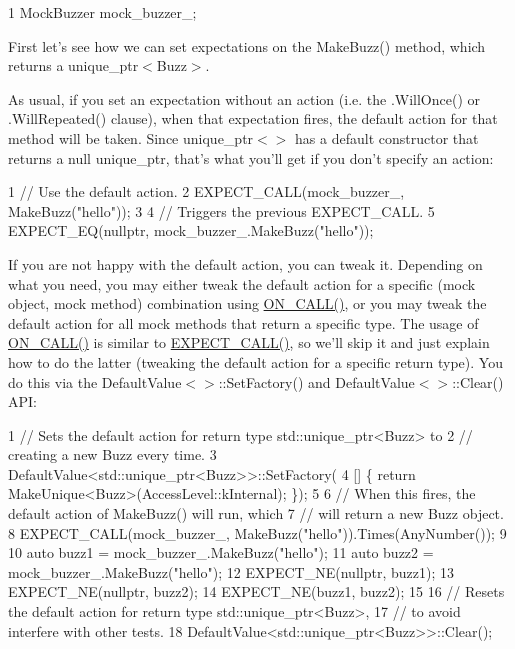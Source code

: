 \begin{DoxyCode}
1 MockBuzzer mock\_buzzer\_;
\end{DoxyCode}


First let’s see how we can set expectations on the {\ttfamily Make\+Buzz()} method, which returns a {\ttfamily unique\+\_\+ptr$<$Buzz$>$}.

As usual, if you set an expectation without an action (i.\+e. the {\ttfamily .Will\+Once()} or {\ttfamily .Will\+Repeated()} clause), when that expectation fires, the default action for that method will be taken. Since {\ttfamily unique\+\_\+ptr$<$$>$} has a default constructor that returns a null {\ttfamily unique\+\_\+ptr}, that’s what you’ll get if you don’t specify an action\+:


\begin{DoxyCode}
1 // Use the default action.
2 EXPECT\_CALL(mock\_buzzer\_, MakeBuzz("hello"));
3 
4 // Triggers the previous EXPECT\_CALL.
5 EXPECT\_EQ(nullptr, mock\_buzzer\_.MakeBuzz("hello"));
\end{DoxyCode}


If you are not happy with the default action, you can tweak it. Depending on what you need, you may either tweak the default action for a specific (mock object, mock method) combination using {\ttfamily \hyperlink{gmock-spec-builders_8h_a5b12ae6cf84f0a544ca811b380c37334}{O\+N\+\_\+\+C\+A\+L\+L()}}, or you may tweak the default action for all mock methods that return a specific type. The usage of {\ttfamily \hyperlink{gmock-spec-builders_8h_a5b12ae6cf84f0a544ca811b380c37334}{O\+N\+\_\+\+C\+A\+L\+L()}} is similar to {\ttfamily \hyperlink{gmock-spec-builders_8h_a535a6156de72c1a2e25a127e38ee5232}{E\+X\+P\+E\+C\+T\+\_\+\+C\+A\+L\+L()}}, so we’ll skip it and just explain how to do the latter (tweaking the default action for a specific return type). You do this via the {\ttfamily Default\+Value$<$$>$\+::\+Set\+Factory()} and {\ttfamily Default\+Value$<$$>$\+::\+Clear()} A\+PI\+:


\begin{DoxyCode}
1 // Sets the default action for return type std::unique\_ptr<Buzz> to
2 // creating a new Buzz every time.
3 DefaultValue<std::unique\_ptr<Buzz>>::SetFactory(
4     [] \{ return MakeUnique<Buzz>(AccessLevel::kInternal); \});
5 
6 // When this fires, the default action of MakeBuzz() will run, which
7 // will return a new Buzz object.
8 EXPECT\_CALL(mock\_buzzer\_, MakeBuzz("hello")).Times(AnyNumber());
9 
10 auto buzz1 = mock\_buzzer\_.MakeBuzz("hello");
11 auto buzz2 = mock\_buzzer\_.MakeBuzz("hello");
12 EXPECT\_NE(nullptr, buzz1);
13 EXPECT\_NE(nullptr, buzz2);
14 EXPECT\_NE(buzz1, buzz2);
15 
16 // Resets the default action for return type std::unique\_ptr<Buzz>,
17 // to avoid interfere with other tests.
18 DefaultValue<std::unique\_ptr<Buzz>>::Clear();
\end{DoxyCode}


